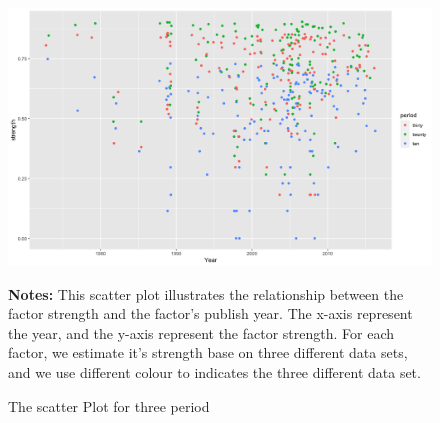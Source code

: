 \documentclass[12pt]{article}
\begin{document}
\begin{landscape}
	\begin{figure}[ht]
			\caption{The scatter Plot for three period}
		\includegraphics[width=\columnwidth]{scatter}
		\centering
					\begin{minipage}{\textwidth}
			{\footnotesize {\bf Notes:} This scatter plot illustrates the relationship between the factor strength and the factor's publish year. The x-axis represent the year, and the y-axis represent the factor strength. For each factor, we estimate it's strength base on three different data sets, and we use different colour to indicates the three different data set.}
		\end{minipage}
	\end{figure}
\end{landscape}
\end{document}

